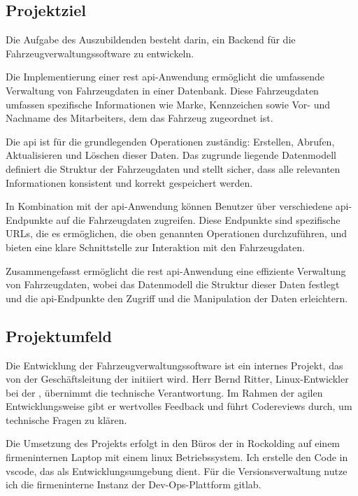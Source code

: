 \subsection{Projektziel}

Die Aufgabe des Auszubildenden besteht darin, ein Backend für die Fahrzeugverwaltungssoftware zu entwickeln.

Die Implementierung einer \gls{rest api}-Anwendung ermöglicht die umfassende Verwaltung von Fahrzeugdaten in einer Datenbank. Diese Fahrzeugdaten umfassen spezifische Informationen wie Marke, Kennzeichen sowie Vor- und Nachname des Mitarbeiters, dem das Fahrzeug zugeordnet ist.

Die \gls{api} ist für die grundlegenden Operationen zuständig: Erstellen, Abrufen, Aktualisieren und Löschen dieser Daten. Das zugrunde liegende Datenmodell definiert die Struktur der Fahrzeugdaten und stellt sicher, dass alle relevanten Informationen konsistent und korrekt gespeichert werden.

In Kombination mit der \gls{api}-Anwendung können Benutzer über verschiedene \gls{api}-Endpunkte auf die Fahrzeugdaten zugreifen. Diese Endpunkte sind spezifische URLs, die es ermöglichen, die oben genannten Operationen durchzuführen, und bieten eine klare Schnittstelle zur Interaktion mit den Fahrzeugdaten.

Zusammengefasst ermöglicht die \gls{rest api}-Anwendung eine effiziente Verwaltung von Fahrzeugdaten, wobei das Datenmodell die Struktur dieser Daten festlegt und die \gls{api}-Endpunkte den Zugriff und die Manipulation der Daten erleichtern.

\subsection{Projektumfeld}

Die Entwicklung der Fahrzeugverwaltungssoftware ist ein internes Projekt, das von der Geschäftsleitung der \beins{} initiiert wird. Herr Bernd Ritter, Linux-Entwickler bei der \beins{}, übernimmt die technische Verantwortung. Im Rahmen der agilen Entwicklungsweise gibt er wertvolles Feedback und führt Codereviews durch, um technische Fragen zu klären.

Die Umsetzung des Projekts erfolgt in den Büros der \beins{} in Rockolding auf einem firmeninternen Laptop mit einem \gls{linux} Betriebssystem. Ich erstelle den Code in \gls{vscode}, das als Entwicklungsumgebung dient. Für die Versionsverwaltung nutze ich die firmeninterne Instanz der Dev-Ops-Plattform \gls{gitlab}.


